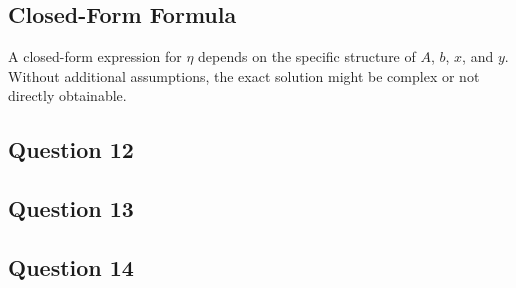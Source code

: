 \documentclass[12p]{article}
\begin{document}
\subsection*{Closed-Form Formula}
A closed-form expression for \(\eta\) depends on the specific structure of \(A\), \(b\), \(x\), and \(y\). Without additional assumptions, the exact solution might be complex or not directly obtainable.


\subsection*{Question 12} 

\subsection*{Question 13} 


\subsection*{Question 14} 

\newpage
\end{document}
